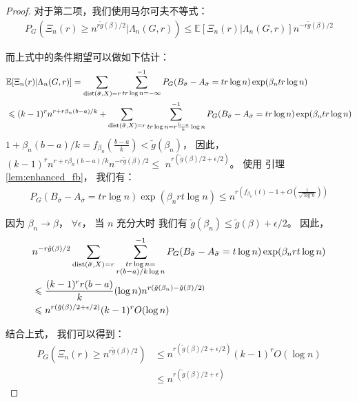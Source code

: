 \begin{proof}
  对于第二项，我们使用马尔可夫不等式：
  \begin{align*}
  P_G(\Xi_n(r) \geq n^{r \tilde{g}(\beta) /2} |\Lambda_n(G,r) )
  \leq \mathbb{E}[\Xi_n(r)|\Lambda_n(G,r)]n^{-r \tilde{g}(\beta) /2} 
  \end{align*}
  
  而上式中的条件期望可以做如下估计：
  \begin{align*}
  &\mathbb{E}[\Xi_n(r)|\Lambda_n(G,r)]=
  \sum_{\operatorname{dist}(\bar{\sigma}, X) = r}\sum_{tr\log n = -\infty }^{-1} 
   P_G(B_{\bar{\sigma}} -A_{\bar{\sigma}}=tr\log n)\exp(\beta_n tr \log n) \\
  & \leqslant (k-1)^r n^{r+r\beta_n(b-a)/k} +
  \sum_{\operatorname{dist}(\bar{\sigma}, X) = r}\sum_{tr\log n = r\frac{b-a}{k}\log n }^{-1} 
   P_G(B_{\bar{\sigma}} -A_{\bar{\sigma}}=tr\log n)\exp(\beta_n tr \log n)
  \end{align*}
  $1+\beta_n(b-a)/k = f_{\beta_n}(\frac{b-a}{k}) < \tilde{g}(\beta_n)$，
  因此，
  $(k-1)^r n^{r+r\beta_n (b-a)/k}n^{-r \tilde{g}(\beta) /2} \leq$
   $n^{r (\tilde{g}(\beta) /2 + \epsilon/2)} $。
  使用 引理 \ref{lem:enhanced_fb}， 我们有：
  \begin{align*}
  P_G(B_{\bar{\sigma}} -A_{\bar{\sigma}}=tr\log n)\exp(\beta_n rt \log n) \leq 
  n^{r(f_{\beta_n}(t)-1 + O(\frac{1}{\sqrt{\log n}}))}
  \end{align*}
  
  因为 $\beta_n \to \beta$， $\forall \epsilon$，
  当 $n$ 充分大时
  我们有 $\tilde{g}(\beta_n) \leq \tilde{g}(\beta) + \epsilon /2$。
  因此，
  \begin{align*}
  &n^{-r \tilde{g}(\beta) /2}\sum_{\operatorname{dist}(\bar{\sigma}, X) = r}\sum_{\substack{tr\log n = \\ r(b-a)/k\log n} }^{-1}
  P_G(B_{\bar{\sigma}} -A_{\bar{\sigma}}=t\log n)\exp(\beta_n rt \log n) \\
  & \leqslant  \frac{(k-1)^r r(b-a)}{k} ( \log n )
  n^{r(\tilde{g}(\beta_n) - \tilde{g}(\beta)/2)}\\
  & \leqslant  n^{r(\tilde{g}(\beta)/2 + \epsilon/2)}  (k-1)^r O(\log n)
  \end{align*}
  
  结合上式， 我们可以得到：
  \begin{align*}
  P_{G}(\Xi_n(r) \geq n^{r \tilde{g}(\beta) /2}) &\leq  n^{r(\tilde{g}(\beta)/2 + \epsilon/2)}  (k-1)^r O(\log n)\\
  &\leq n^{r(\tilde{g}(\beta)/2 + \epsilon)}
  \end{align*}
  

\end{proof}
